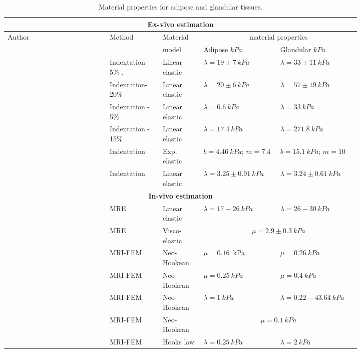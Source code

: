 \begin{table}[!h]
\centering
\begin{tabular}{|p{0.25\linewidth}|p{0.13\linewidth}|p{0.1\linewidth}|p{0.17\linewidth}|p{0.17\linewidth}|}
 \hline
\multicolumn{5}{|c|}{\textbf{Ex-vivo estimation}}\\ \hline

\multirow{2}{*}{ Author} & \multirow{2}{*}{ Method} &  Material & \multicolumn{2}{c|}{material properties}\\  \cline{4-5}

&& model &Adipose $kPa$ & Glandular $kPa$ \\  \hline

\cite{krouskop_elastic_1998} & Indentation-5\% . & Linear elastic & $\lambda=19 \pm 7\ kPa$ &$ \lambda =33 \pm 11\ kPa$ \\ \hline
 \cite{krouskop_elastic_1998}   & Indentation- 20\%& Linear elastic & $\lambda=20 \pm 6\ kPa  $& $\lambda= 57 \pm 19\ kPa $ \\  \hline
 \cite{wellman_breast_1999}  & Indentation - 5\% & Linear elastic & $\lambda=6.6\ kPa $ & $\lambda= 33 \ kPa$\\ \hline
 \cite{wellman_breast_1999}  & Indentation - 15\% & Linear elastic &$ \lambda = 17.4\ kPa $& $\lambda= 271.8\ kPa $ \\ \hline
 \cite{azar_methods_2002} & Indentation & Exp. elastic & $b = 4.46\ kPa$; $m=7.4$ & $b = 15.1\ kPa$; $m=10$ \\ \hline
 \cite{samani_method_2004} & Indentation & Linear elastic & $\lambda= 3.25 \pm 0.91\ kPa $ & $\lambda= 3.24 \pm 0.61\ kPa $ \\ \hline \hline
 \multicolumn{5}{|c|}{\textbf{In-vivo estimation}}\\ \hline
 \cite{van_initial_2003} & MRE & Linear elastic & $\lambda= 17-26\ kPa $ & $\lambda= 26-30\ kPa $ \\ \hline
 \cite{sinkus_viscoelastic_2005}&MRE& Visco-elastic & \multicolumn{2}{|c|}{$\mu = 2.9 \pm 0.3\ kPa$} \\ \hline
 \cite{rajagopal_creating_2008}  & MRI-FEM& Neo-Hookean & $\mu = 0.16$\ kPa & $\mu = 0.26\ kPa$ \\ \hline
 \cite{carter_determining_2009} & MRI-FEM& Neo-Hookean &$\mu = 0.25\ kPa$ & $\mu = 0.4\ kPa$ \\ \hline
 \cite{han_development_2012} & MRI-FEM & Neo-Hookean & $\lambda= 1\ kPa$ & $\lambda = 0.22-43.64\ kPa $ \\ \hline 
 \cite{gamage_modelling_2012} & MRI-FEM & Neo-Hookean & \multicolumn{2}{|c|}{$\mu = 0.1\ kPa $} \\ \hline
 \cite{griesenauer_breast_2017} & MRI-FEM & Hooks law & $\lambda= 0.25\ kPa$ & $\lambda= 2\ kPa$\\ \hline
\end{tabular}
\caption{Material properties for adipose and glandular tissues.}
\label{table:materialproperties}
\end{table}

